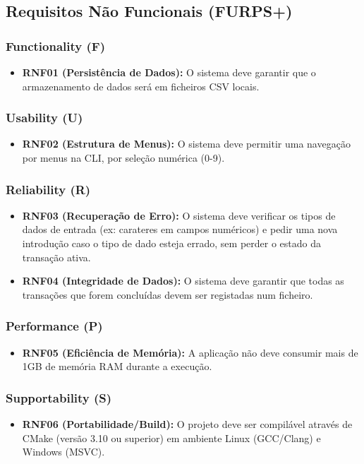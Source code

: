 \documentclass[a4paper]{llncs}
\begin{document}
\subsection{Requisitos Não Funcionais (FURPS+)}

\subsubsection{Functionality (F)}
\begin{itemize}
    \item \textbf{RNF01 (Persistência de Dados):} O sistema deve garantir que o armazenamento de dados será em ficheiros CSV locais.
\end{itemize}
\subsubsection{Usability (U)}
\begin{itemize}
    \item \textbf{RNF02 (Estrutura de Menus):} O sistema deve permitir uma navegação por menus na CLI, por seleção numérica (0-9).
\end{itemize}
\subsubsection{Reliability (R)}
\begin{itemize}
    \item \textbf{RNF03 (Recuperação de Erro):} O sistema deve verificar os tipos de dados de entrada (ex: carateres em campos numéricos) e pedir uma nova introdução caso o tipo de dado esteja errado, sem perder o estado da transação ativa.
    \item \textbf{RNF04 (Integridade de Dados):} O sistema deve garantir que todas as transações que forem concluídas devem ser registadas num ficheiro.
\end{itemize}
\subsubsection{Performance (P)}
\begin{itemize}
    \item \textbf{RNF05 (Eficiência de Memória):} A aplicação não deve consumir mais de 1GB de memória RAM durante a execução.
\end{itemize}
\subsubsection{Supportability (S)}
\begin{itemize}
    \item \textbf{RNF06 (Portabilidade/Build):} O projeto deve ser compilável através de CMake (versão 3.10 ou superior) em ambiente Linux (GCC/Clang) e Windows (MSVC).
\end{itemize}
\end{document}
